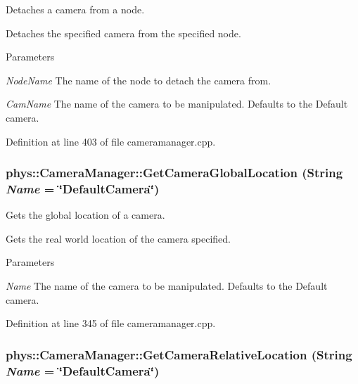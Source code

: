 Detaches a camera from a node. 

Detaches the specified camera from the specified node. 
\begin{DoxyParams}{Parameters}
\item[{\em NodeName}]The name of the node to detach the camera from. \item[{\em CamName}]The name of the camera to be manipulated. Defaults to the Default camera. \end{DoxyParams}


Definition at line 403 of file cameramanager.cpp.

\hypertarget{classphys_1_1CameraManager_a53ef7e8f0a4227a5a35db88fe74772fa}{
\subsubsection[{GetCameraGlobalLocation}]{ phys::CameraManager::GetCameraGlobalLocation ({\bf String} {\em Name} = {\ttfamily \char`\"{}DefaultCamera\char`\"{}})}}
\label{d9/d91/classphys_1_1CameraManager_a53ef7e8f0a4227a5a35db88fe74772fa}


Gets the global location of a camera. 

Gets the real world location of the camera specified. 
\begin{DoxyParams}{Parameters}
\item[{\em Name}]The name of the camera to be manipulated. Defaults to the Default camera. \end{DoxyParams}


Definition at line 345 of file cameramanager.cpp.

\hypertarget{classphys_1_1CameraManager_a8557218460fbc94a029f74945fa2517c}{
\subsubsection[{GetCameraRelativeLocation}]{ phys::CameraManager::GetCameraRelativeLocation ({\bf String} {\em Name} = {\ttfamily \char`\"{}DefaultCamera\char`\"{}})}}
\label{d9/d91/classphys_1_1CameraManager_a8557218460fbc94a029f74945fa2517c}


